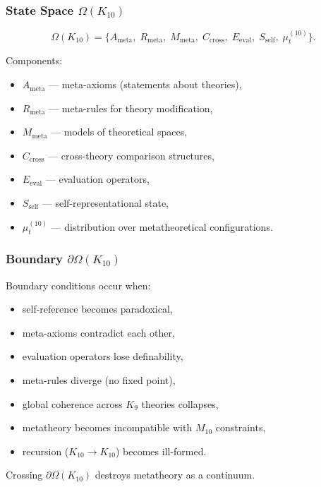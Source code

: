 \subsubsection{State Space $\Omega(K_{10})$}

\[
\Omega(K_{10})=
\{
A_{\mathrm{meta}},\;
R_{\mathrm{meta}},\;
M_{\mathrm{meta}},\;
C_{\mathrm{cross}},\;
E_{\mathrm{eval}},\;
S_{\mathrm{self}},\;
\mu^{(10)}_t
\}.
\]

Components:
\begin{itemize}
    \item $A_{\mathrm{meta}}$ — meta-axioms (statements about theories),
    \item $R_{\mathrm{meta}}$ — meta-rules for theory modification,
    \item $M_{\mathrm{meta}}$ — models of theoretical spaces,
    \item $C_{\mathrm{cross}}$ — cross-theory comparison structures,
    \item $E_{\mathrm{eval}}$ — evaluation operators,
    \item $S_{\mathrm{self}}$ — self-representational state,
    \item $\mu^{(10)}_t$ — distribution over metatheoretical configurations.
\end{itemize}

\subsubsection{Boundary $\partial\Omega(K_{10})$}

Boundary conditions occur when:
\begin{itemize}
    \item self-reference becomes paradoxical,
    \item meta-axioms contradict each other,
    \item evaluation operators lose definability,
    \item meta-rules diverge (no fixed point),
    \item global coherence across $K_9$ theories collapses,
    \item metatheory becomes incompatible with $M_{10}$ constraints,
    \item recursion ($K_{10}\to K_{10}$) becomes ill-formed.
\end{itemize}

Crossing $\partial\Omega(K_{10})$ destroys metatheory as a continuum.

